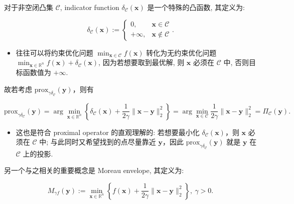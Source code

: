 \begin{defblock}
对于非空闭凸集 $\mathcal{C}$, indicator function $\delta_{\mathcal{C}}(\bm{x})$ 是一个特殊的凸函数, 其定义为:

\[
\delta_{\mathcal{C}}(\bm{x}) := \begin{cases} 0, & \bm{x} \in \mathcal{C}\\ +\infty, & \bm{x} \notin \mathcal{C}\end{cases}.
\]

\end{defblock}

\begin{itemize}
\item {}往往可以将约束优化问题 $\min_{\bm{x} \in \mathcal{C}} f(\bm{x})$ 转化为无约束优化问题 $\min_{\bm{x} \in \mathbb{R}^n} f(\bm{x}) + \delta_{\mathcal{C}}(\bm{x})$, 因为若想要取到最优解, 则 $\bm{x}$ 必须在 $\mathcal{C}$ 中, 否则目标函数值为 $+\infty$.


\end{itemize}

故若考虑 $\text{prox}_{\gamma \delta_{\mathcal{C}}}(\bm{y})$，则有

\[
\text{prox}_{\gamma \delta_{\mathcal{C}}}(\bm{y}) = \arg\min_{\bm{x} \in \mathbb{R}^n} \left\{ \delta_{\mathcal{C}}(\bm{x}) + \frac{1}{2\gamma}\|\bm{x}-\bm{y}\|_2^2 \right\} = \arg\min_{\bm{x} \in \mathcal{C}} \frac{1}{2\gamma}\|\bm{x}-\bm{y}\|_2^2 = \Pi_{\mathcal{C}}(\bm{y}).
\]

\begin{itemize}
\item {}这也是符合 proximal operator 的直观理解的: 若想要最小化 $\delta_{\mathcal{C}}(\bm{x})$，则 $\bm{x}$ 必须在 $\mathcal{C}$ 中; 与此同时又希望找到的点尽量靠近 $\bm{y}$，因此 $\text{prox}_{\gamma \delta_{\mathcal{C}}}(\bm{y})$ 就是 $\bm{y}$ 在 $\mathcal{C}$ 上的投影.


\end{itemize}


\begin{defblock}
另一个与之相关的重要概念是 Moreau envelope, 其定义为:

\[
M_{\gamma f}(\bm{y}) := \min_{\bm{x} \in \mathbb{R}^n} \left\{f(\bm{x}) + \frac{1}{2\gamma}\|\bm{x}-\bm{y}\|_2^2\right\},~ \gamma > 0.
\]

\end{defblock}

